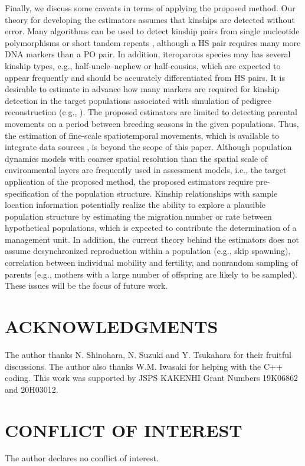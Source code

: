 \documentclass[12pt, English]{article}
\begin{document}
\begin{spacing}{1.9}
Finally, we discuss some caveats in terms of applying the proposed method. Our theory for developing the estimators assumes that kinships are detected without error. Many algorithms can be used to detect kinship pairs from single nucleotide polymorphisms or short tandem repeats \cite[e.g., ][]{Wang_2009Genetics, Huisman_2017}, although a HS pair requires many more DNA markers than a PO pair. In addition, iteroparous species may has several kinship types, e.g., half-uncle--nephew or half-cousins, which are expected to appear frequently and should be accurately differentiated from HS pairs. It is desirable to estimate in advance how many markers are required for kinship detection in the target populations associated with simulation of pedigree reconstruction (e.g., \cite{Anderson_2020}). The proposed estimators are limited to detecting parental movements on a period between breeding seasons in the given populations. Thus, the estimation of fine-scale spatiotemporal movements, which is available to integrate data sources \cite[]{Thorson_2021}, is beyond the scope of this paper. Although population dynamics models with coarser spatial resolution than the spatial scale of environmental layers are frequently used in assessment models, i.e., the target application of the proposed method, the proposed estimators require pre-specification of the population structure. Kinship relationships with sample location information potentially realize the ability to explore a plausible population structure by estimating the migration number or rate between hypothetical populations, which is expected to contribute the determination of a management unit. In addition, the current theory behind the estimators does not assume desynchronized reproduction within a population (e.g., skip spawning), correlation between individual mobility and fertility, and nonrandom sampling of parents (e.g., mothers with a large number of offspring are likely to be sampled). These issues will be the focus of future work.

\section*{ACKNOWLEDGMENTS}
The author thanks N. Shinohara, N. Suzuki and Y. Tsukahara for their fruitful discussions. The author also thanks W.M. Iwasaki for helping with the C{++} coding. This work was supported by JSPS KAKENHI Grant Numbers 19K06862 and 20H03012.

\section*{CONFLICT OF INTEREST}
The author declares no conflict of interest.


\end{spacing}
\end{document}
